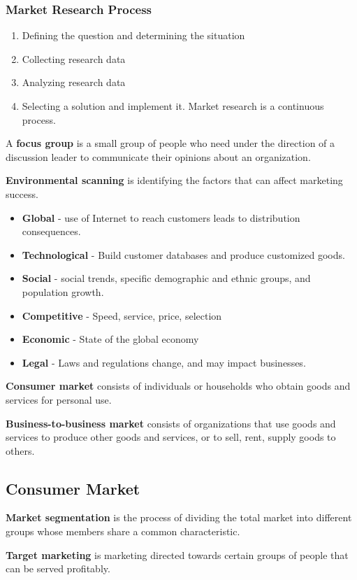 \documentclass[english, 12pt]{article}
\begin{document}
\subsubsection*{Market Research Process}
\begin{enumerate}
\item Defining the question and determining the situation
\item Collecting research data
\item Analyzing research data
\item Selecting a solution and implement it. Market research is a continuous process.
\end{enumerate}
\begin{defn}
A \textbf{focus group} is a small group of people who need under the direction of a discussion leader to communicate their opinions about an organization. 
\end{defn}
\begin{defn}
\textbf{Environmental scanning} is identifying the factors that can affect marketing success.
\end{defn}
\begin{itemize}
\item \textbf{Global} - use of Internet to reach customers leads to distribution consequences.
\item \textbf{Technological} - Build customer databases and produce customized goods.
\item \textbf{Social} -  social trends, specific demographic and ethnic groups, and population growth.
\item \textbf{Competitive} - Speed, service, price, selection
\item \textbf{Economic} - State of the global economy
\item \textbf{Legal} - Laws and regulations change, and may impact businesses.
\end{itemize}
\begin{defn}
\textbf{Consumer market} consists of individuals or households who obtain goods and services for personal use.
\end{defn}
\begin{defn}
\textbf{Business-to-business market} consists of organizations that use goods and services to produce other goods and services, or to sell, rent, supply goods to others.
\end{defn}
\subsection{Consumer Market}
\begin{defn}
\textbf{Market segmentation} is the process of dividing the total market into different groups whose members share a common characteristic. 
\end{defn}
\begin{defn}
\textbf{Target marketing} is marketing directed towards certain groups of people that can be served profitably.
\end{defn}
\end{document}
